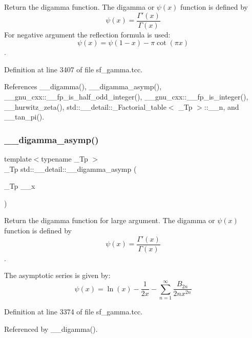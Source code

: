 Return the digamma function. The digamma or $ \psi(x) $ function is defined by \[ \psi(x) = \frac{\Gamma'(x)}{\Gamma(x)} \] For negative argument the reflection formula is used\+: \[ \psi(x) = \psi(1-x) - \pi \cot(\pi x) \]. 



Definition at line 3407 of file sf\+\_\+gamma.\+tcc.



References \+\_\+\+\_\+digamma(), \+\_\+\+\_\+digamma\+\_\+asymp(), \+\_\+\+\_\+gnu\+\_\+cxx\+::\+\_\+\+\_\+fp\+\_\+is\+\_\+half\+\_\+odd\+\_\+integer(), \+\_\+\+\_\+gnu\+\_\+cxx\+::\+\_\+\+\_\+fp\+\_\+is\+\_\+integer(), \+\_\+\+\_\+hurwitz\+\_\+zeta(), std\+::\+\_\+\+\_\+detail\+::\+\_\+\+Factorial\+\_\+table$<$ \+\_\+\+Tp $>$\+::\+\_\+\+\_\+n, and \+\_\+\+\_\+tan\+\_\+pi().

\mbox{\label{namespacestd_1_1____detail_a5264ad32c92b701acb90b543a1a96521}} 
\subsubsection{\texorpdfstring{\+\_\+\+\_\+digamma\+\_\+asymp()}{\_\_digamma\_asymp()}}
{\footnotesize\ttfamily template$<$typename \+\_\+\+Tp $>$ \\
\+\_\+\+Tp std\+::\+\_\+\+\_\+detail\+::\+\_\+\+\_\+digamma\+\_\+asymp (\begin{DoxyParamCaption}\item[{\+\_\+\+Tp}]{\+\_\+\+\_\+x }\end{DoxyParamCaption})}



Return the digamma function for large argument. The digamma or $ \psi(x) $ function is defined by \[ \psi(x) = \frac{\Gamma'(x)}{\Gamma(x)} \]. 

The asymptotic series is given by\+: \[ \psi(x) = \ln(x) - \frac{1}{2x} - \sum_{n=1}^{\infty} \frac{B_{2n}}{2 n x^{2n}} \] 

Definition at line 3374 of file sf\+\_\+gamma.\+tcc.



Referenced by \+\_\+\+\_\+digamma().

\mbox{\label{namespacestd_1_1____detail_ae9d54f73a3e05c2b242e992a0a93d5de}} 
